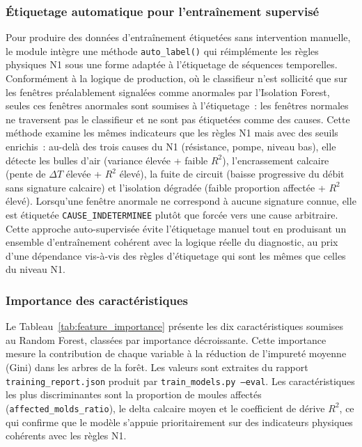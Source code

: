 \subsubsection{Étiquetage automatique pour l'entraînement supervisé}

Pour produire des données d'entraînement étiquetées sans intervention manuelle, le module intègre une méthode \texttt{auto\_label()} qui réimplémente les règles physiques N1 sous une forme adaptée à l'étiquetage de séquences temporelles. Conformément à la logique de production, où le classifieur n'est sollicité que sur les fenêtres préalablement signalées comme anormales par l'Isolation Forest, seules ces fenêtres anormales sont soumises à l'étiquetage~: les fenêtres normales ne traversent pas le classifieur et ne sont pas étiquetées comme des causes. Cette méthode examine les mêmes indicateurs que les règles N1 mais avec des seuils enrichis~: au-delà des trois causes du N1 (résistance, pompe, niveau bas), elle détecte les bulles d'air (variance élevée + faible \(R^2\)), l'encrassement calcaire (pente de \(\Delta T\) élevée + \(R^2\) élevé), la fuite de circuit (baisse progressive du débit sans signature calcaire) et l'isolation dégradée (faible proportion affectée + \(R^2\) élevé). Lorsqu'une fenêtre anormale ne correspond à aucune signature connue, elle est étiquetée \texttt{CAUSE\_INDETERMINEE} plutôt que forcée vers une cause arbitraire. Cette approche auto-supervisée évite l'étiquetage manuel tout en produisant un ensemble d'entraînement cohérent avec la logique réelle du diagnostic, au prix d'une dépendance vis-à-vis des règles d'étiquetage qui sont les mêmes que celles du niveau N1.

\subsubsection{Importance des caractéristiques}

Le Tableau~\ref{tab:feature_importance} présente les dix caractéristiques soumises au Random Forest, classées par importance décroissante. Cette importance mesure la contribution de chaque variable à la réduction de l'impureté moyenne (Gini) dans les arbres de la forêt. Les valeurs sont extraites du rapport \texttt{training\_report.json} produit par \texttt{train\_models.py --eval}. Les caractéristiques les plus discriminantes sont la proportion de moules affectés (\texttt{affected\_molds\_ratio}), le delta calcaire moyen et le coefficient de dérive \(R^2\), ce qui confirme que le modèle s'appuie prioritairement sur des indicateurs physiques cohérents avec les règles N1.

